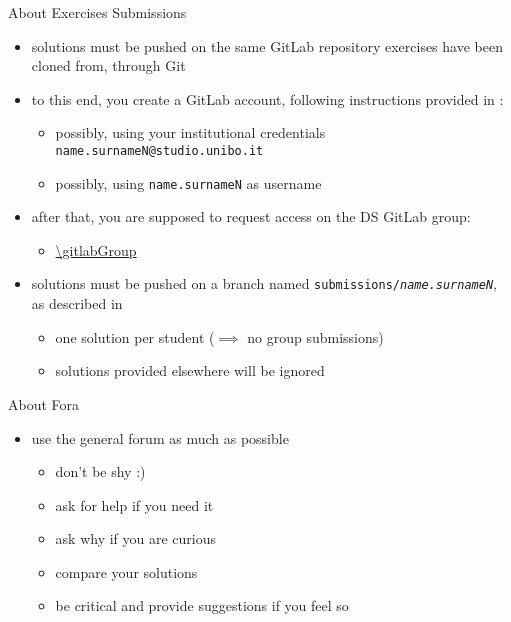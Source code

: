\documentclass[presentation]{beamer}\mode<presentation>{\usetheme{AMSBolognaFC}}
\begin{document}
\begin{frame}[c]{About Exercises Submissions}

    \begin{itemize}
        \item solutions must be pushed on the same GitLab repository exercises have been cloned from, \alert{through Git}

        \vfill

        \item to this end, you create a GitLab account, following instructions provided in \cite{envSetup}:
        \begin{itemize}
            \item possibly, using your institutional credentials \texttt{\alert{name.surnameN}@studio.unibo.it}
            \item possibly, using \texttt{\alert{name.surnameN}} as username
        \end{itemize}

        \vfill

        \item after that, you are supposed to request access on the DS \academicYearShort{} GitLab group:
        \begin{itemize}
            \item \url{\gitlabGroup}
        \end{itemize}

        \vfill

        \item solutions must be pushed on a branch named \alert{\texttt{submissions/\textit{name.surnameN}}}, as described in \cite{envSetup}
        \begin{itemize}
            \item one solution per student ($\implies$ no group submissions)
            \item solutions provided elsewhere will be ignored
        \end{itemize}
    \end{itemize}
\end{frame}

\begin{frame}[c]{About Fora}
    \begin{itemize}
        \item use the general forum as much as possible
        \\
        \uurl{\generalForum}
        \begin{itemize}
            \item don't be shy :)
            \item ask for help if you need it
            \item ask why if you are curious
            \item compare your solutions
            \item be critical and provide suggestions if you feel so
        \end{itemize}
    \end{itemize}
\end{frame}
\end{document}
